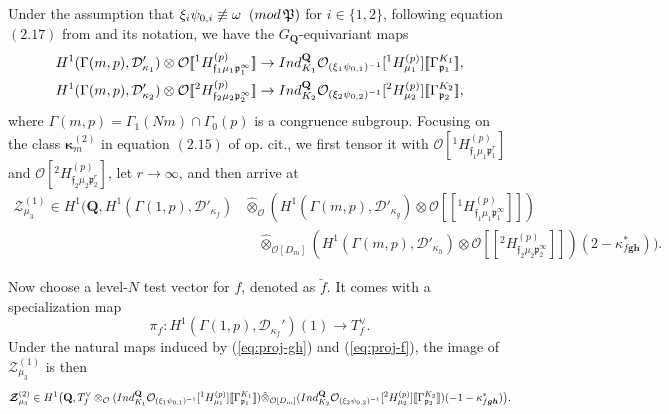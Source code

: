 \documentclass[10pt,letterpaper]{amsart}
\theoremstyle{plain}
\theoremstyle{definition}
\theoremstyle{definition}
\theoremstyle{plain}
\theoremstyle{plain}
\theoremstyle{plain}
\theoremstyle{remark}
\numberwithin{equation}{section}
\newcommand{\ch}{\xi}
\newcommand{\pp}{\mathfrak{p}}
\newcommand{\fkf}{\mathfrak{f}}
\def\cO{\mathcal O}
\newcommand{\Q}{\mathbf{Q}}
\newcommand{\bfg}{{\boldsymbol{g}}}
\newcommand{\bfh}{{\boldsymbol{h}}}
\begin{document}
Under the assumption that
${\ch_i\psi_{0,i}\not\equiv\omega\;\;({\rm mod}\,{\mathfrak{P}})}$
for $i\in\{1,2\}$, following equation $(2.17)$ from \cite[$\S 2.3$]{CD} and its notation, we have the $G_\Q$-equivariant maps 
\begin{equation}\label{eq:proj-gh}
\begin{aligned}
H^1(\Gamma(m,p),\mathcal{D}'_{\kappa_1})\otimes\cO[\![^1H_{\fkf_1\mu_1\pp_1^\infty}^{(p)}]\!]&\rightarrow{\rm Ind}_{K_1}^\Q\cO_{(\ch_1\psi_{0,1})^{-1}}[^1H_{\mu_1}^{(p)}][\![\Gamma_{\pp_1}^{K_1}]\!],\\
H^1(\Gamma(m,p),\mathcal{D}'_{\kappa_2})\otimes\cO[\![^2H_{\fkf_2\mu_2\pp_2^\infty}^{(p)}]\!]&\rightarrow{\rm Ind}_{K_2}^\Q\cO_{(\ch_2\psi_{0,2})^{-1}}[^2H_{\mu_2}^{(p)}][\![\Gamma_{\pp_2}^{K_2}]\!],
\end{aligned}
\end{equation}
where $\Gamma(m,p)=\Gamma_1(Nm)\cap\Gamma_0(p)$ is a congruence subgroup.
Focusing on the class $\boldsymbol{\kappa}_m^{(2)}$ in equation $(2.15)$ of op. cit., we first tensor it with $\cO[^1H_{\fkf_1\mu_1\pp_1^r}^{(p)}]$ and $\cO[^2H_{\fkf_2\mu_2\pp_2^r}^{(p)}]$, let $r\rightarrow\infty$, and then arrive at
\begin{align*}\label{eq:good-big-3}
\boldsymbol{\mathcal{Z}}^{(1)}_{\mu_3}\in H^1\bigl(\Q,H^1(\Gamma(1,p),\mathcal{D}'_{\kappa_f})&\hat\otimes_{\cO} (H^1(\Gamma(m,p),\mathcal{D}'_{\kappa_g})\otimes\cO[\![^1H_{\fkf_1\mu_1\pp_1^\infty}^{(p)}]\!])\\
&\quad\hat\otimes_{\cO[D_m]} (H^1(\Gamma(m,p),\mathcal{D}'_{\kappa_h})\otimes\cO[\![^2H_{\fkf_2\mu_2\pp_2^\infty}^{(p)}]\!])(2-\kappa_{f\bfg\bfh}^*)\bigr).
\end{align*}

Now choose a level-$N$ test vector for $f$, denoted as $\breve{f}$. It comes with a specialization map
\begin{equation}\label{eq:proj-f}
\pi_f:H^1(\Gamma(1,p),\mathcal{D}_{\kappa_f}')(1)\rightarrow T_f^\vee.
\end{equation}
Under the natural maps induced by (\ref{eq:proj-gh}) and (\ref{eq:proj-f}), the image of $\boldsymbol{\mathcal{Z}}^{(1)}_{\mu_3}$  is then
\[
\boldsymbol{\mathcal{Z}}^{(2)}_{\mu_3}\in H^1\bigl(\Q,T_f^\vee\otimes_{\cO}({\rm Ind}_{K_1}^\Q\cO_{(\ch_1\psi_{0,1})^{-1}}[^1H_{\mu_1}^{(p)}][\![\Gamma_{\pp_1}^{K_1}]\!])\hat\otimes_{\cO[D_m]}({\rm Ind}_{K_2}^\Q\cO_{(\ch_2\psi_{0,2})^{-1}}[^2H_{\mu_2}^{(p)}][\![\Gamma_{\pp_2}^{K_2}]\!])(-1-\kappa_{f\bfg\bfh}^*)\bigr).
\]
\end{document}
